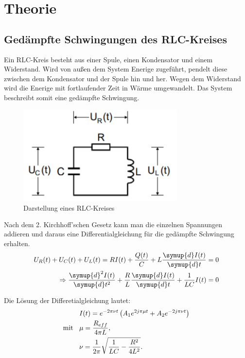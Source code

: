 \section{Theorie}
\label{sec:Theorie}

\subsection{Gedämpfte Schwingungen des RLC-Kreises}
Ein RLC-Kreis besteht aus einer Spule, einen Kondensator und einem Widerstand. Wird von außen
dem System Enerige zugeführt, pendelt diese zwischen dem Kondensator und der Spule hin und her.
Wegen dem Widerstand wird die Enerige mit fortlaufender Zeit in Wärme umgewandelt. Das System beschreibt
somit eine gedämpfte Schwingung.

\begin{figure}[H]
  \centering
  \includegraphics[height=5cm]{RLC-Kreis(Grundsaetzlich).PNG}
  \caption{Darstellung eines RLC-Kreises}
  \label{fig:RLC-Kreis(mit Widerstand)}
\end{figure}

Nach dem 2. Kirchhoff'schen Gesetz kann man die einzelnen Spannungen addieren und daraus eine Differentialgleichung
für die gedämpfte Schwingung erhalten.
\begin{align}
  U_R(t) + U_C(t) + U_L(t) = RI(t) +\frac{Q(t)}{C} + L\frac{\symup{d}I(t)}{\symup{d}t} = 0 \\
  \Rightarrow \frac{\symup{d}^2I(t)}{\symup{d}t^2} +\frac{R}{L}\frac{\symup{d}I(t)}{\symup{d}t} + \frac{1}{LC}I(t) = 0
\end{align}

Die Lösung der Differetialgleichung lautet:
\begin{align}
  &I(t) = e^{-2\pi \nu t} \left(A_1 e^{2j\pi \mu t} + A_2 e^{-2j\pi \nu t}\right)   \\
\text{mit} \:\:\:\:  &\mu = \frac{R_{eff}}{4\pi L} , \\
  &\nu = \frac{1}{2\pi} \sqrt{\frac{1}{LC} - \frac{R^2}{4L^2}} \notag.
\end{align}

